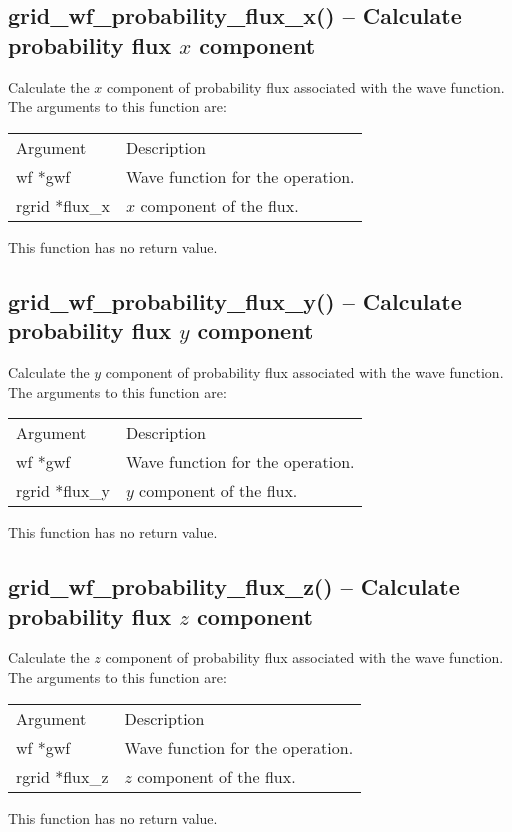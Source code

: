 \documentclass[12pt,letterpaper]{report}
\begin{document}
\subsection{grid\_wf\_probability\_flux\_x() -- Calculate probability flux $x$ component}

Calculate the $x$ component of probability flux associated with the wave function. The arguments to this function are:
\begin{longtable}{p{} p{}}
Argument & Description\\
\cline{1-2}
wf *gwf & Wave function for the operation.\\
rgrid *flux\_x & $x$ component of the flux.\\
\end{longtable}
\noindent
This function has no return value.

\subsection{grid\_wf\_probability\_flux\_y() -- Calculate probability flux $y$ component}

Calculate the $y$ component of probability flux associated with the wave function. The arguments to this function are:
\begin{longtable}{p{} p{}}
Argument & Description\\
\cline{1-2}
wf *gwf & Wave function for the operation.\\
rgrid *flux\_y & $y$ component of the flux.\\
\end{longtable}
\noindent
This function has no return value.

\subsection{grid\_wf\_probability\_flux\_z() -- Calculate probability flux $z$ component}

Calculate the $z$ component of probability flux associated with the wave function. The arguments to this function are:
\begin{longtable}{p{} p{}}
Argument & Description\\
\cline{1-2}
wf *gwf & Wave function for the operation.\\
rgrid *flux\_z & $z$ component of the flux.\\
\end{longtable}
\noindent
This function has no return value.
\end{document}
